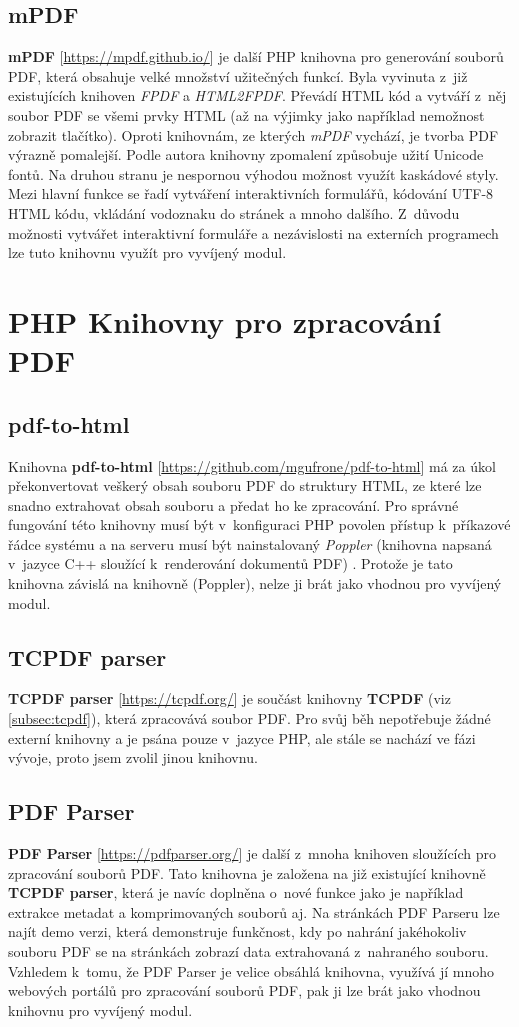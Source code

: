 \subsection{mPDF}
\textbf{mPDF} [\url{https://mpdf.github.io/}] je další PHP knihovna pro generování souborů PDF, která obsahuje velké množství užitečných funkcí. Byla vyvinuta z~již existujících knihoven \textit{FPDF} a \textit{HTML2FPDF}. Převádí HTML kód a vytváří z~něj soubor PDF se všemi prvky HTML (až na výjimky jako například nemožnost zobrazit tlačítko). Oproti knihovnám, ze kterých \textit{mPDF} vychází, je tvorba PDF výrazně pomalejší. Podle autora knihovny zpomalení způsobuje užití Unicode fontů. Na druhou stranu je nespornou výhodou možnost využít kaskádové styly. Mezi hlavní funkce se řadí vytváření interaktivních formulářů, kódování UTF-8 HTML kódu, vkládání vodoznaku do stránek a mnoho dalšího. Z~důvodu možnosti vytvářet interaktivní formuláře a nezávislosti na externích programech lze tuto knihovnu využít pro vyvíjený modul.
\section{PHP Knihovny pro zpracování PDF}
\subsection{pdf-to-html}
Knihovna \textbf{pdf-to-html} [\url{https://github.com/mgufrone/pdf-to-html}] má za úkol překonvertovat veškerý obsah souboru PDF do struktury HTML, ze které lze snadno extrahovat obsah souboru a předat ho ke zpracování. Pro správné fungování této knihovny musí být v~konfiguraci PHP povolen přístup k~příkazové řádce systému a na serveru musí být nainstalovaný \textit{Poppler} (knihovna napsaná v~jazyce C++ sloužící k~renderování dokumentů PDF) \cite{pdfToHtml}. Protože je tato knihovna závislá na knihovně (Poppler), nelze ji brát jako vhodnou pro vyvíjený modul. 
\subsection{TCPDF parser}
\textbf{TCPDF parser} [\url{https://tcpdf.org/}] je součást knihovny \textbf{TCPDF} (viz \ref{subsec:tcpdf}), která zpracovává soubor PDF. Pro svůj běh nepotřebuje žádné externí knihovny a je psána pouze v~jazyce PHP, ale stále se nachází ve fázi vývoje, proto jsem zvolil jinou knihovnu.

\subsection{PDF Parser}
\textbf{PDF Parser} [\url{https://pdfparser.org/}] je další z~mnoha knihoven sloužících pro zpracování souborů PDF. Tato knihovna je založena na již existující knihovně \textbf{TCPDF parser}, která je navíc doplněna o~nové funkce jako je například extrakce metadat a komprimovaných souborů aj. Na stránkách PDF Parseru lze najít demo verzi, která demonstruje funkčnost, kdy po nahrání jakéhokoliv souboru PDF se na stránkách zobrazí data extrahovaná z~nahraného souboru. Vzhledem k~tomu, že PDF Parser je velice obsáhlá knihovna, využívá jí mnoho webových portálů pro zpracování souborů PDF, pak ji lze brát jako vhodnou knihovnu pro vyvíjený modul.

